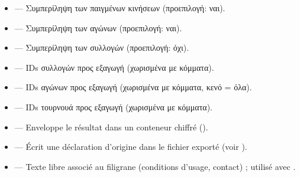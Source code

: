 \documentclass[letterpaper,10pt,greek]{sphinxmanual}
\begin{document}
\begin{itemize}
\item {} 
\sphinxAtStartPar
{} — Συμπερίληψη των παιγμένων κινήσεων (προεπιλογή: ναι).

\item {} 
\sphinxAtStartPar
{} — Συμπερίληψη των αγώνων (προεπιλογή: ναι).

\item {} 
\sphinxAtStartPar
{} — Συμπερίληψη των συλλογών (προεπιλογή: όχι).

\item {} 
\sphinxAtStartPar
{} — IDs συλλογών προς εξαγωγή (χωρισμένα με κόμματα).

\item {} 
\sphinxAtStartPar
{} — IDs αγώνων προς εξαγωγή (χωρισμένα με κόμματα, κενό = όλα).

\item {} 
\sphinxAtStartPar
{} — IDs τουρνουά προς εξαγωγή (χωρισμένα με κόμματα).

\item {} 
\sphinxAtStartPar
{} — Enveloppe le résultat dans un conteneur chiffré ().

\item {} 
\sphinxAtStartPar
{} — Écrit une déclaration d’origine  dans le fichier
exporté (voir {\hyperref[\detokenize{manuel:diffusion-controlee}]{}}).

\item {} 
\sphinxAtStartPar
{} — Texte libre associé au filigrane (conditions
d’usage, contact) ; utilisé avec .

\end{itemize}

\sphinxAtStartPar
{}
\end{document}
